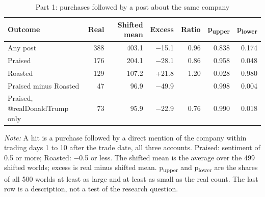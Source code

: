\begin{table}[htbp]
\centering
\small
\setlength{\tabcolsep}{4pt}
\caption{Part 1: purchases followed by a post about the same company}
\label{tab:part1}
\begin{tabular}{lrrrrrr}
\toprule
Outcome & Real & Shifted mean & Excess & Ratio & p\textsubscript{upper} & p\textsubscript{lower} \\
\midrule
Any post & 388 & 403.1 & $-$15.1 & 0.96 & 0.838 & 0.174 \\
Praised & 176 & 204.1 & $-$28.1 & 0.86 & 0.958 & 0.048 \\
Roasted & 129 & 107.2 & +21.8 & 1.20 & 0.028 & 0.980 \\
\midrule
Praised minus Roasted & 47 & 96.9 & $-$49.9 &  & 0.998 & 0.004 \\
\midrule
Praised, @realDonaldTrump only & 73 & 95.9 & $-$22.9 & 0.76 & 0.990 & 0.018 \\
\bottomrule
\end{tabular}
\par\medskip
\begin{minipage}{\linewidth}\footnotesize\textit{Note:} A hit is a purchase followed by a direct mention of the company within trading days 1 to 10 after the trade date, all three accounts. Praised: sentiment of 0.5 or more; Roasted: $-$0.5 or less. The shifted mean is the average over the 499 shifted worlds; excess is real minus shifted mean. p\textsubscript{upper} and p\textsubscript{lower} are the shares of all 500 worlds at least as large and at least as small as the real count. The last row is a description, not a test of the research question.\end{minipage}
\end{table}
